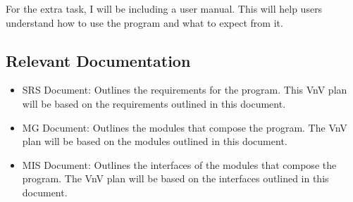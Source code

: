 \documentclass[12pt, titlepage]{article}
\begin{document}
For the extra task, I will be including a user manual. This will help users
understand how to use the program and what to expect from it.



\subsection{Relevant Documentation}


  \begin{itemize}
    \item \cite{SRS} SRS Document: Outlines the requirements for the \progname{}
    program. This VnV plan will be based on the requirements outlined in this
    document.
    \item MG Document: Outlines the modules that compose the \progname{} program.
    The VnV plan will be based on the modules outlined in this document.
    \item MIS Document: Outlines the interfaces of the modules that compose the
    \progname{} program. The VnV plan will be based on the interfaces outlined in
    this document.
  \end{itemize}
\end{document}
